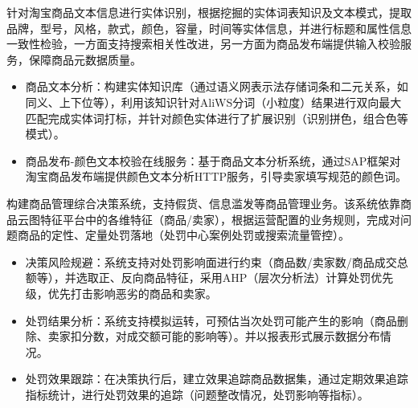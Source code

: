 \documentclass{resume}
\begin{document}
\begin{onehalfspacing}
针对淘宝商品文本信息进行实体识别，根据挖掘的实体词表知识及文本模式，提取品牌，型号，风格，款式，颜色，容量，时间等实体信息，并进行标题和属性信息一致性检验，一方面支持搜索相关性改进，另一方面为商品发布端提供输入校验服务，保障商品元数据质量。
\begin{itemize}
  \item 商品文本分析：构建实体知识库（通过语义网表示法存储词条和二元关系，如同义、上下位等），利用该知识针对AliWS分词（小粒度）结果进行双向最大匹配完成实体词打标，并针对颜色实体进行了扩展识别（识别拼色，组合色等模式）。
  \item 商品发布-颜色文本校验在线服务：基于商品文本分析系统，通过SAP框架对淘宝商品发布端提供颜色文本分析HTTP服务，引导卖家填写规范的颜色词。
\end{itemize}
\end{onehalfspacing}

\begin{onehalfspacing}
构建商品管理综合决策系统，支持假货、信息滥发等商品管理业务。该系统依靠商品云图特征平台中的各维特征（商品/卖家），根据运营配置的业务规则，完成对问题商品的定性、定量处罚落地（处罚中心案例处罚或搜索流量管控）。
\begin{itemize}
  \item 决策风险规避：系统支持对处罚影响面进行约束（商品数/卖家数/商品成交总额等），并选取正、反向商品特征，采用AHP（层次分析法）计算处罚优先级，优先打击影响恶劣的商品和卖家。
  \item 处罚结果分析：系统支持模拟运转，可预估当次处罚可能产生的影响（商品删除、卖家扣分数，对成交额可能的影响等）。并以报表形式展示数据分布情况。
  \item 处罚效果跟踪：在决策执行后，建立效果追踪商品数据集，通过定期效果追踪指标统计，进行处罚效果的追踪（问题整改情况，处罚影响等指标）。
\end{itemize}
\end{onehalfspacing}

\end{document}
